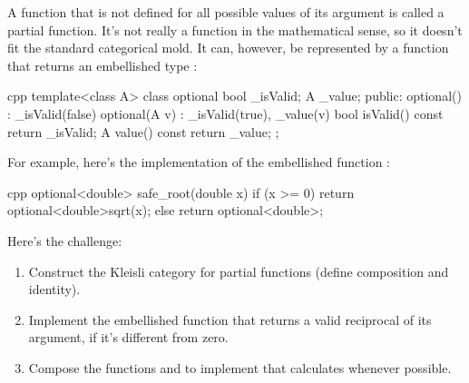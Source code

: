 A function that is not defined for all possible values of its argument
is called a partial function. It's not really a function in the
mathematical sense, so it doesn't fit the standard categorical mold. It
can, however, be represented by a function that returns an embellished
type :

\begin{snip}{cpp}
template<class A> class optional {
    bool _isValid;
    A _value;
public: 
    optional()    : _isValid(false) {}
    optional(A v) : _isValid(true), _value(v) {}
    bool isValid() const { return _isValid; }
    A value() const { return _value; }
};
\end{snip}
For example, here's the implementation of the embellished function
:

\begin{snip}{cpp}
optional<double> safe_root(double x) {
    if (x >= 0) return optional<double>{sqrt(x)}; 
    else return optional<double>{};
}
\end{snip}
Here's the challenge:

\begin{enumerate}
\tightlist
\item
  Construct the Kleisli category for partial functions (define
  composition and identity).
\item
  Implement the embellished function  that
  returns a valid reciprocal of its argument, if it's different from
  zero.
\item
  Compose the functions  and  to implement
   that calculates 
  whenever possible.
\end{enumerate}
